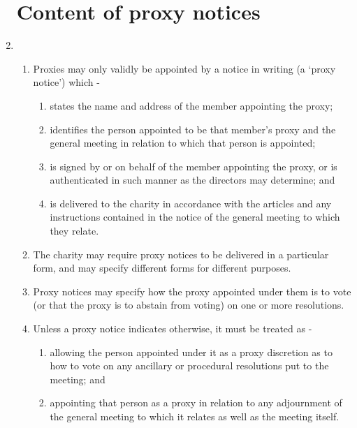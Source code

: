 \documentclass{article}
\begin{document}
\begin{enumerate}[label=\arabic*]
    \section{Content of proxy notices}
    \item \begin{enumerate}[label=(\arabic*)]
        \item Proxies may only validly be appointed by a notice in writing (a
        ‘proxy notice’) which -
        \begin{enumerate}[label=(\alph*)]
            \item states the name and address of the member appointing
            the proxy;
            \item identifies the person appointed to be that member’s
            proxy and the general meeting in relation to which that
            person is appointed;
            \item is signed by or on behalf of the member appointing the
            proxy, or is authenticated in such manner as the directors
            may determine; and
            \item is delivered to the charity in accordance with the articles
            and any instructions contained in the notice of the general
            meeting to which they relate.
        \end{enumerate}
        \item The charity may require proxy notices to be delivered in
        a particular form, and may specify different forms for
        different purposes.
        \item Proxy notices may specify how the proxy appointed under them
        is to vote (or that the proxy is to abstain from voting) on one or
        more resolutions.
        \item Unless a proxy notice indicates otherwise, it must be treated as -
        \begin{enumerate}[label=(\alph*)]
            \item allowing the person appointed under it as a proxy
            discretion as to how to vote on any ancillary or procedural
            resolutions put to the meeting; and
            \item appointing that person as a proxy in relation to any
            adjournment of the general meeting to which it relates as
            well as the meeting itself.
        \end{enumerate}
    \end{enumerate}
\end{enumerate}
\end{document}
